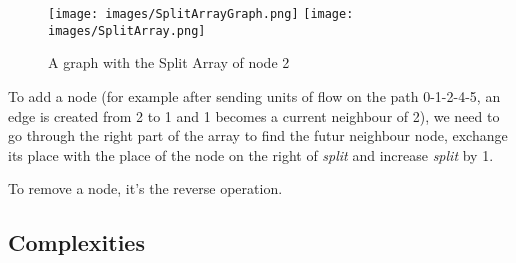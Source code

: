 \begin{figure}[!h]
\texttt{[image: images/SplitArrayGraph.png]}\hfill
\texttt{[image: images/SplitArray.png]}
\caption{A graph with the Split Array of node 2}
\end{figure}

To add a node (for example after sending units of flow on the path 0-1-2-4-5, an edge is created from 2 to 1 and 1 becomes a current neighbour of 2), we need to go through the right part of the array to find the futur neighbour node, exchange its place with the place of the node on the right of \textit{split} and increase \textit{split} by 1. \newline

To remove a node, it's the reverse operation.


\subsection{Complexities}

